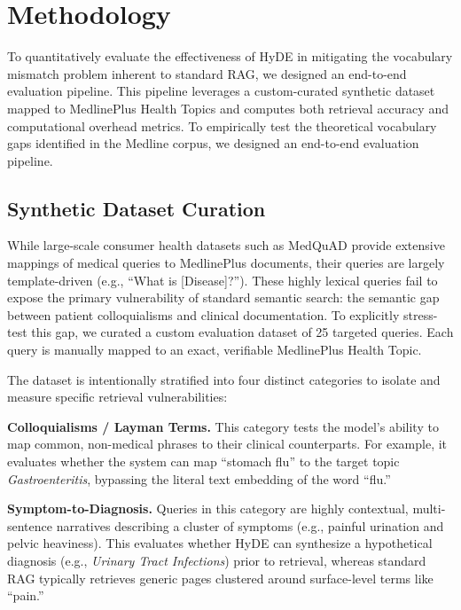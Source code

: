 \section{Methodology}
\label{sec:methodology}

To quantitatively evaluate the effectiveness of HyDE in mitigating the vocabulary mismatch problem inherent to standard RAG, we designed an end-to-end evaluation pipeline. This pipeline leverages a custom-curated synthetic dataset mapped to MedlinePlus Health Topics and computes both retrieval accuracy and computational overhead metrics. To empirically test the theoretical vocabulary gaps identified in the Medline corpus, we designed an end-to-end evaluation pipeline.

\subsection{Synthetic Dataset Curation}
While large-scale consumer health datasets such as MedQuAD \citep{benabacha2019medquad} provide extensive mappings of medical queries to MedlinePlus documents, their queries are largely template-driven (e.g., ``What is [Disease]?''). These highly lexical queries fail to expose the primary vulnerability of standard semantic search: the semantic gap between patient colloquialisms and clinical documentation. To explicitly stress-test this gap, we curated a custom evaluation dataset of 25 targeted queries. Each query is manually mapped to an exact, verifiable MedlinePlus Health Topic.

The dataset is intentionally stratified into four distinct categories to isolate and measure specific retrieval vulnerabilities:

\noindent\textbf{Colloquialisms / Layman Terms.} This category tests the model's ability to map common, non-medical phrases to their clinical counterparts. For example, it evaluates whether the system can map ``stomach flu'' to the target topic \textit{Gastroenteritis}, bypassing the literal text embedding of the word ``flu.''

\noindent\textbf{Symptom-to-Diagnosis.} Queries in this category are highly contextual, multi-sentence narratives describing a cluster of symptoms (e.g., painful urination and pelvic heaviness). This evaluates whether HyDE can synthesize a hypothetical diagnosis (e.g., \textit{Urinary Tract Infections}) prior to retrieval, whereas standard RAG typically retrieves generic pages clustered around surface-level terms like ``pain.''

